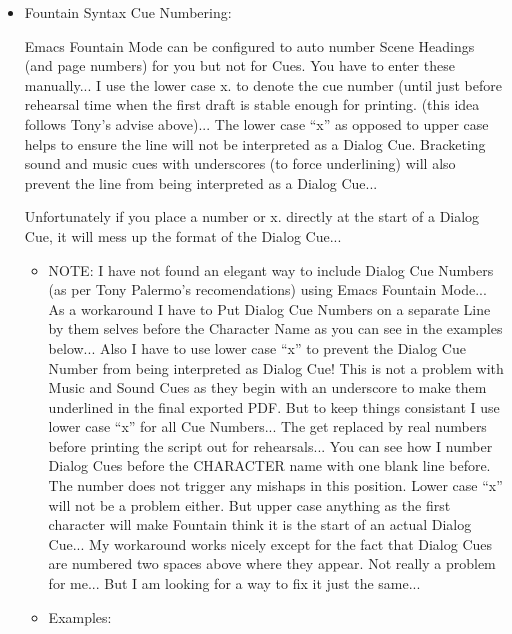 \documentclass[openleft,oneside,showtrims]{memoir}
\begin{document}
\begin{itemize}
\item Fountain Syntax Cue Numbering:
\label{sec:orgcdce1e2}

Emacs Fountain Mode can be configured to auto number Scene Headings (and page numbers) for you but not for Cues.  You have to enter these manually...  I use the lower case x. to denote the cue number (until just before rehearsal time when the first draft is stable enough for printing. (this idea follows Tony's advise above)... The lower case ``x'' as opposed to upper case helps to ensure the line will not be interpreted as a Dialog Cue.  Bracketing sound and music cues with underscores (to force underlining) will also prevent the line from being interpreted as a Dialog Cue...

Unfortunately if you place a number or x. directly at the start of a Dialog Cue, it will mess up the format of the Dialog Cue...

\begin{itemize}
\item NOTE: I have not found an elegant way to include Dialog Cue Numbers (as per Tony Palermo's recomendations) using Emacs Fountain Mode...  As a workaround I have to Put Dialog Cue Numbers on a separate Line by them selves before the Character Name as you can see in the examples below... Also I have to use lower case ``x'' to prevent the Dialog Cue Number from being interpreted as Dialog Cue!  This is not a problem with Music and Sound Cues as they begin with an underscore to make them underlined in the final exported PDF. But to keep things consistant I use lower case ``x'' for all Cue Numbers...  The get replaced by real numbers before printing the script out for rehearsals... You can see how I number Dialog Cues before the CHARACTER name with one blank line before.  The number does not trigger any mishaps in this position.  Lower case ``x'' will not be a problem either.  But upper case anything as the first character will make Fountain think it is the start of an actual Dialog Cue... My workaround works nicely except for the fact that Dialog Cues are numbered two spaces above where they appear.  Not really a problem for me...  But I am looking for a way to fix it just the same...
\end{itemize}

\begin{itemize}
\item Examples:
\label{sec:org862fb30}

\lstset{language=fountain,label= ,caption= ,captionpos=b,numbers=none}
\begin{lstlisting}


\end{lstlisting}
\end{itemize}
\end{itemize}
\end{document}
